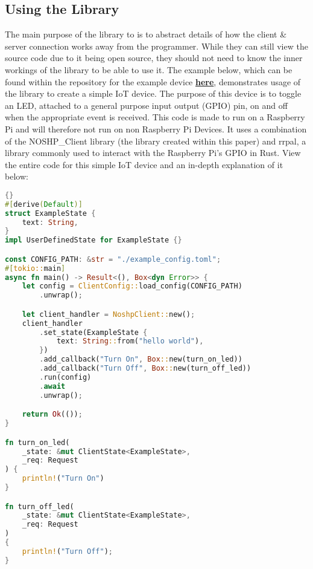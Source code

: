 \subsection{Using the Library}
The main purpose of the library to is to abstract details of how the client \& server connection works away from the programmer. While they can still view the source code due to it being open source, they should not need to know the inner workings of the library to be able to use it. The example below, which can be found within the repository for the example device \textbf{\href{https://github.com/niknik3610/Example-Iot-Device}{here}}, demonstrates usage of the library to create a simple IoT device. The purpose of this device is to toggle an LED, attached to a general purpose input output (GPIO) pin, on and off when the appropriate event is received. This code is made to run on a Raspberry Pi and will therefore not run on non Raspberry Pi Devices. It uses a combination of the NOSHP\_Client library (the library created within this paper) and rrpal, a library commonly used to interact with the Raspberry Pi's GPIO in Rust. View the entire code for this simple IoT device and an in-depth explanation of it below: 

\begin{lstlisting}[language=Rust, style=boxed, showstringspaces=false]{}
#[derive(Default)]
struct ExampleState {
    text: String,
}
impl UserDefinedState for ExampleState {}

const CONFIG_PATH: &str = "./example_config.toml";
#[tokio::main]
async fn main() -> Result<(), Box<dyn Error>> {
    let config = ClientConfig::load_config(CONFIG_PATH)
        .unwrap();

    let client_handler = NoshpClient::new();
    client_handler
        .set_state(ExampleState {
            text: String::from("hello world"),
        })
        .add_callback("Turn On", Box::new(turn_on_led))
        .add_callback("Turn Off", Box::new(turn_off_led))
        .run(config)
        .await
        .unwrap();

    return Ok(());
}

fn turn_on_led(
    _state: &mut ClientState<ExampleState>,
    _req: Request
) {
    println!("Turn On")
}

fn turn_off_led(
    _state: &mut ClientState<ExampleState>,
    _req: Request
) 
{
    println!("Turn Off");
}
\end{lstlisting}

